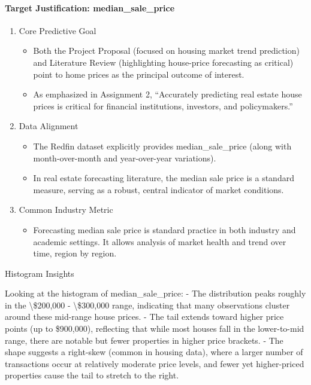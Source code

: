 \documentclass[11pt]{article}
\providecommand{\tightlist}{%
      \setlength{\itemsep}{0pt}\setlength{\parskip}{0pt}}
\begin{document}
    \paragraph{\texorpdfstring{Target Justification:
\textbf{median\_sale\_price}}{Target Justification: median\_sale\_price}}\label{target-justification-median_sale_price}

\begin{enumerate}
\def\labelenumi{\arabic{enumi}.}
\tightlist
\item
  Core Predictive Goal

  \begin{itemize}
  \tightlist
  \item
    Both the Project Proposal (focused on housing market trend
    prediction) and Literature Review (highlighting house-price
    forecasting as critical) point to home prices as the principal
    outcome of interest.
  \item
    As emphasized in Assignment 2, ``Accurately predicting real estate
    house prices is critical for financial institutions, investors, and
    policymakers.''
  \end{itemize}
\item
  Data Alignment

  \begin{itemize}
  \tightlist
  \item
    The Redfin dataset explicitly provides median\_sale\_price (along
    with month-over-month and year-over-year variations).
  \item
    In real estate forecasting literature, the median sale price is a
    standard measure, serving as a robust, central indicator of market
    conditions.
  \end{itemize}
\item
  Common Industry Metric

  \begin{itemize}
  \tightlist
  \item
    Forecasting median sale price is standard practice in both industry
    and academic settings. It allows analysis of market health and trend
    over time, region by region.
  \end{itemize}
\end{enumerate}

    Histogram Insights

Looking at the histogram of median\_sale\_price: - The distribution
peaks roughly in the \textbackslash\$200,000 - \textbackslash\$300,000
range, indicating that many observations cluster around these mid-range
house prices. - The tail extends toward higher price points (up to
\$900,000), reflecting that while most houses fall in the lower-to-mid
range, there are notable but fewer properties in higher price brackets.
- The shape suggests a right-skew (common in housing data), where a
larger number of transactions occur at relatively moderate price levels,
and fewer yet higher-priced properties cause the tail to stretch to the
right.
\end{document}
